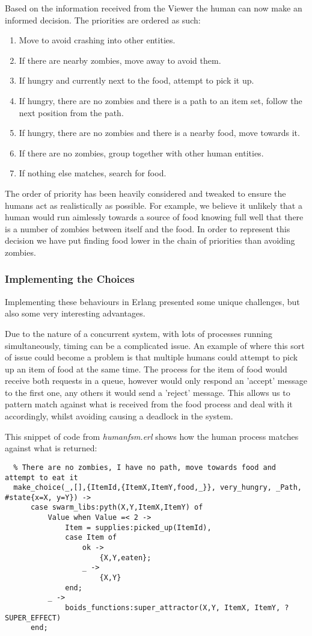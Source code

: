 Based on the information received from the Viewer the human can now make an informed decision. The priorities are ordered as such:
\begin{enumerate}
  \item Move to avoid crashing into other entities.
  \item If there are nearby zombies, move away to avoid them.
  \item If hungry and currently next to the food, attempt to pick it up.
  \item If hungry, there are no zombies and there is a path to an item set, follow the next position from the path.
  \item If hungry, there are no zombies and there is a nearby food, move towards it.
  \item If there are no zombies, group together with other human entities.
  \item If nothing else matches, search for food.
\end{enumerate}

The order of priority has been heavily considered and tweaked to ensure the humans act as realistically as possible. For example, we believe it unlikely that a human would run aimlessly towards a source of food knowing full well that there is a number of zombies between itself and the food. In order to represent this decision we have put finding food lower in the chain of priorities than avoiding zombies.

\subsubsection{Implementing the Choices}
Implementing these behaviours in Erlang presented some unique challenges, but also some very interesting advantages.

Due to the nature of a concurrent system, with lots of processes running simultaneously, timing can be a complicated issue. An example of where this sort of issue could become a problem is that multiple humans could attempt to pick up an item of food at the same time. The process for the item of food would receive both requests in a queue, however would only respond an 'accept' message to the first one, any others it would send a 'reject' message. This allows us to pattern match against what is received from the food process and deal with it accordingly, whilst avoiding causing a deadlock in the system.

This snippet of code from \emph{human\textunderscore fsm.erl} shows how the human process matches against what is returned:
\begin{lstlisting}
  % There are no zombies, I have no path, move towards food and attempt to eat it
  make_choice(_,[],{ItemId,{ItemX,ItemY,food,_}}, very_hungry, _Path, #state{x=X, y=Y}) ->
      case swarm_libs:pyth(X,Y,ItemX,ItemY) of
          Value when Value =< 2 ->
              Item = supplies:picked_up(ItemId),
              case Item of
                  ok ->
                      {X,Y,eaten};
                  _ ->
                      {X,Y}
              end;
          _ ->
              boids_functions:super_attractor(X,Y, ItemX, ItemY, ?SUPER_EFFECT)
      end;
\end{lstlisting}

